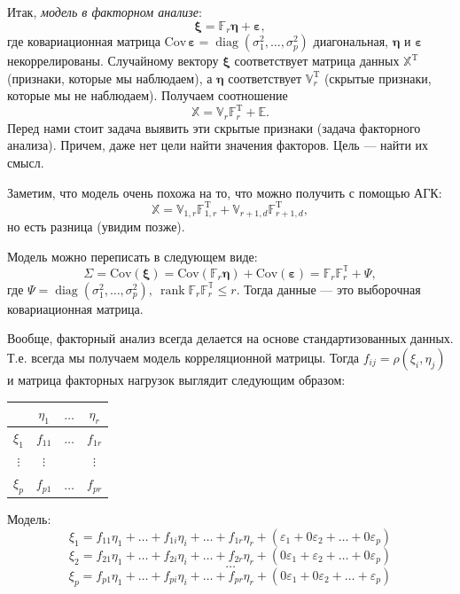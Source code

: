 \documentclass[specialist, 12pt,
subf, %
href, colorlinks=true,
substylefile = spbu.rtx,
]{disser}
\DeclareMathOperator{\diag}{diag}
\DeclareMathOperator{\rnk}{rank}
\begin{document}
Итак, \emph{модель в факторном анализе}: $$\bm\xi=\mathbb{F}_r\bm\eta+\bm\varepsilon,$$ где  ковариационная матрица $\text{Cov}\,\bm\varepsilon=\diag(\sigma_1^2,\ldots,\sigma_p^2)$ диагональная, $\bm\eta$ и $\bm\varepsilon$ некоррелированы. Случайному вектору $\bm\xi$ соответствует матрица данных $\mathbb{X}^\mathrm{T}$ (признаки, которые мы наблюдаем), а $\bm\eta$ соответствует $\mathbb{V}_r^\mathrm{T}$ (скрытые признаки, которые мы не наблюдаем). Получаем соотношение $$\mathbb{X}=\mathbb{V}_r\mathbb{F}_r^\mathrm{T}+\mathbb{E}.$$ Перед нами стоит задача выявить эти скрытые признаки (задача факторного анализа). Причем, даже нет цели найти значения факторов. Цель --- найти их смысл.

Заметим, что модель очень похожа на то, что можно получить с помощью АГК:
$$\mathbb{X}=\mathbb{V}_{1,r}\mathbb{F}_{1,r}^\mathrm{T}+\mathbb{V}_{r+1,d}\mathbb{F}_{r+1,d}^\mathrm{T},$$
но есть разница (увидим позже).

Модель можно переписать в следующем виде:
\begin{equation*} \Sigma = \text{Cov}(\bm\xi)=\text{Cov}(\mathbb{F}_r\bm\eta)+\text{Cov}(\bm\varepsilon)=\mathbb{F}_r\mathbb{F}_r^\mathbb{T}+\Psi,
\end{equation*}
где $\Psi=\diag(\sigma_1^2,\ldots,\sigma_p^2), ~\rnk \mathbb{F}_r\mathbb{F}_r^\mathbb{T}\le r. $ Тогда данные --- это выборочная ковариационная матрица.

Вообще, факторный анализ всегда делается на основе стандартизованных данных. Т.е. всегда мы получаем модель корреляционной матрицы. Тогда $f_{ij}=\rho(\xi_i,\eta_j)$ и матрица факторных нагрузок выглядит следующим образом:

\begin{table}[H]
	\centering
	\begin{tabular}{c|ccc}
      &	$\eta_1$ & $\ldots$ & $\eta_r$ \\
		\hline
	$\xi_1$	&      $f_{11}$    &   $\ldots$ & $f_{1r}$             \\
		$\vdots$	&     $\vdots$    &   & $\vdots$            \\
		$\xi_p$	&      $f_{p1}$    &   $\ldots$ & $f_{pr}$             \\
	\end{tabular}
\end{table}

Модель:
\begin{equation*}
\xi_1=f_{11}\eta_1+\ldots+f_{1i}\eta_i+\ldots+f_{1r}\eta_r+(\varepsilon_1+0\varepsilon_2+\ldots+0\varepsilon_p)
\end{equation*}
\begin{equation*}
\xi_2=f_{21}\eta_1+\ldots+f_{2i}\eta_i+\ldots+f_{2r}\eta_r+(0\varepsilon_1+\varepsilon_2 +\ldots+0\varepsilon_p)
\end{equation*}
\begin{equation*}
\ldots
\end{equation*}
\begin{equation*}
\xi_p=f_{p1}\eta_1+\ldots+f_{pi}\eta_i+\ldots+f_{pr}\eta_r+(0\varepsilon_1+0\varepsilon_2+\ldots+\varepsilon_p)
\end{equation*}
\end{document}

